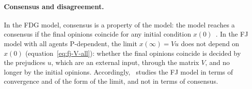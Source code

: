 \paragraph{Consensus and disagreement.}
In the FDG model, consensus is a property of the model: the model reaches a consensus
if the final opinions coincide for any initial condition
$x(0)$~\cite{proskurnikov2017tutorial}. In the FJ model with all agents P-dependent,
the limit $x(\infty) = Vu$ does not depend on $x(0)$
(equation~\eqref{eq:fj-V-all}): whether the final opinions coincide is decided by the
prejudices $u$, which are an external input, through the matrix $V$, and no longer by
the initial opinions. Accordingly,~\cite{proskurnikov2017tutorial} studies the FJ model in
terms of convergence and of the form of the limit, and not in terms of consensus.

